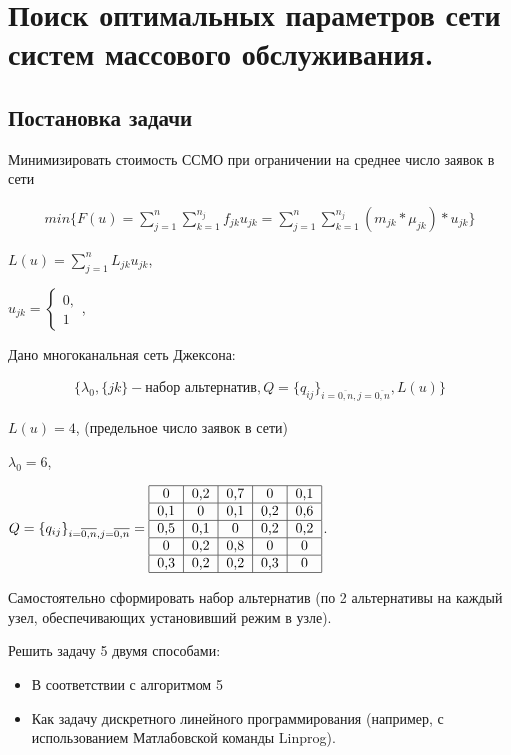 \newpage
\section{Поиск оптимальных параметров сети систем массового обслуживания.}

\subsection{Постановка задачи}
Минимизировать стоимость ССМО при ограничении на среднее число заявок в сети

\begin{gather*}
min\{F(u) = \sum\limits_{j=1}^n \sum\limits_{k=1}^{n_j} f_{jk} u_{jk} = \sum\limits_{j=1}^n \sum\limits_{k=1}^{n_j} (m_{jk} * \mu_{jk}) * u_{jk} \}
\end{gather*} 

$ L(u) = \sum\limits_{j=1}^n L_{jk} u_{jk}$,

$ u_{jk} =
  \begin{cases}
    0,\\
    1
 \end{cases}$,
 
Дано многоканальная сеть Джексона:

\begin{gather*}
\{ \lambda_0, \{jk\} - \text{набор альтернатив}, Q=\{q_{ij}\}_{i=\overline{0,n}, j=\overline{0,n}}, L(u) \}
\end{gather*} 

$L(u) = 4$, (предельное число заявок в сети)

$\lambda_0 = 6$,

$Q=\{q_{ij}\}_{i=\overline{0,n}, j=\overline{0,n}} = \begin{tabular}{|c|c|c|c|c|}
\hline 
0 & 0,2 & 0,7 & 0 & 0,1 \\ 
\hline 
0,1 & 0 & 0,1 & 0,2 & 0,6 \\ 
\hline 
0,5 & 0,1 & 0 & 0,2 & 0,2 \\ 
\hline 
0 & 0,2 & 0,8 & 0 & 0 \\ 
\hline 
0,3 & 0,2 & 0,2 & 0,3 & 0 \\ 
\hline 
\end{tabular} $.

Самостоятельно сформировать набор альтернатив (по 2 альтернативы на каждый узел, обеспечивающих установивший режим в узле).

Решить задачу 5 двумя способами:

\begin{itemize}
\item В соответствии с алгоритмом 5
\item Как задачу дискретного линейного программирования (например, с использованием Матлабовской команды Linprog).
\end{itemize}

